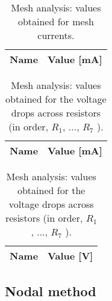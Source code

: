 \begin{table}[h]
  \centering
  \begin{tabular}{|l|r|}
    \hline
    {\bf Name} & {\bf Value [mA]} \\ \hline
    
  \end{tabular}
  \caption{Mesh analysis: values obtained for mesh currents.}
  \label{tab:op1}
\end{table}

\begin{table}[h]
  \parbox{.45\linewidth}{
    \centering
    \begin{tabular}{|c|c|}
      \hline
      {\bf Name} & {\bf Value [mA]} \\ \hline
      
    \end{tabular}
    \caption{Mesh analysis: values obtained for the currents running through the resistors.}
  }
  \hfill
  \parbox{.45\linewidth}{
    \centering
    \begin{tabular}{|c|c|}
      \hline
      {\bf Name} & {\bf Value [V]} \\ \hline
      
    \end{tabular}
    \caption{Mesh analysis: values obtained for the voltage drops across resistors (in order, $R_{1}$, ..., $R_{7}$ ).}
  }
\end{table}

\subsection{Nodal method}

